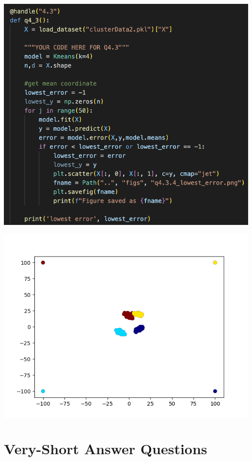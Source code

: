 \documentclass{article}
\begin{document}
{{\begin{center}
     \includegraphics[width=400pt]{figs/4.3.4.3.png}
 \end{center}
 \begin{center}
     \includegraphics[width=400pt]{figs/q4.3.4_lowest_error.png}
 \end{center}
}
}
\pagebreak

\section{Very-Short Answer Questions}
\end{document}
